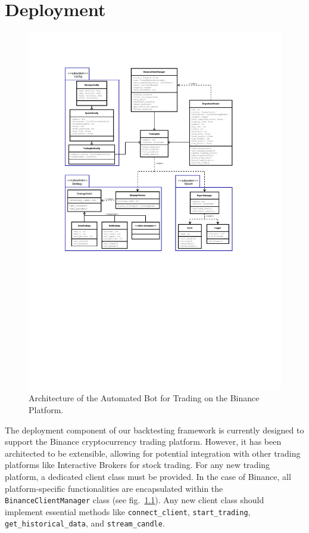 \chapter{Deployment}

\begin{figure}[H]
\centering
\includegraphics[page=1, trim=30mm 110mm 30mm 25mm, width=1.1\textwidth, clip]{./pdf/deployment_uml.pdf}
\caption{Architecture of the Automated Bot for Trading on the Binance Platform.}
\label{fig:deployment_arch}
\end{figure}

The deployment component of our backtesting framework is currently designed to support the Binance cryptocurrency trading platform.
However, it has been architected to be extensible, allowing for potential integration with other trading platforms like Interactive Brokers for stock trading.
For any new trading platform, a dedicated client class must be provided.
In the case of Binance, all platform-specific functionalities are encapsulated within the \texttt{BinanceClientManager} class (see fig.~\ref{fig:deployment_arch}).
Any new client class should implement essential methods like \texttt{connect\_client}, \texttt{start\_trading}, \texttt{get\_historical\_data}, and \texttt{stream\_candle}.

